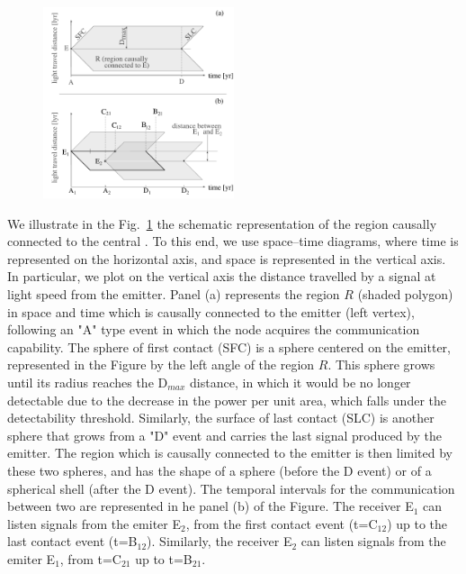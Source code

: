 \begin{figure}[!t]
   \centering
   \includegraphics[width=0.5\textwidth]{F_scheme.pdf}
    \label{F_scheme}
\end{figure}



       


We illustrate in the Fig.~\ref{F_scheme} the schematic representation
of the region causally connected to the central \ceti{}.
%
To this end, we use space--time diagrams, where time is represented on
the horizontal axis, and space is represented in the vertical axis.
%
In particular, we plot on the vertical axis the distance travelled by
a signal at light speed from the emitter.
%
Panel (a) represents the region $R$ (shaded polygon) 
in space and time which is causally
connected to the emitter (left vertex), following an "A" type event
in which the node acquires the communication capability.
%
The sphere of first contact (SFC) is a sphere centered on the emitter,
represented in the Figure by the left angle of the region $R$.
%
This sphere grows until its radius reaches the D$_{max}$ distance, in which
it would be no longer detectable due to the decrease in the power per
unit area, which falls under the detectability threshold.
%
Similarly, the surface of last contact (SLC) is another sphere that 
grows from a
"D" event and carries the last signal produced by the
emitter.
%
The region which is causally connected to the emitter is then limited
by these two spheres, and has the shape of a sphere (before the D
event) or of a spherical shell (after the D event).
%
The temporal intervals for
the communication between two \cetis{} are represented in he
panel (b) of the Figure.
%
The receiver \ceti{} E$_1$ can listen signals from the emiter \ceti{} E$_2$,
from the first contact event (t=C$_{12}$) up to the last contact event (t=B$_{12}$).
%
Similarly, 
the receiver \ceti{} E$_2$ can listen signals from the emiter \ceti{} E$_1$,
from t=C$_{21}$ up to t=B$_{21}$.

